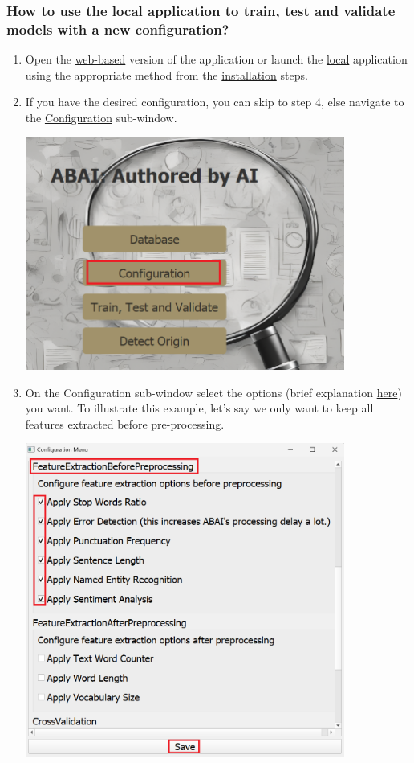\subsubsection{How to use the local application to train, test and validate models with a new configuration?}
\begin{enumerate}
    \item Open the \hyperref[subsubsec:Web application]{web-based} version of the application or launch the \hyperref[subsubsec:Local application]{local} application using the appropriate method from the \hyperref[subsec:First steps]{installation} steps.
    \item If you have the desired configuration, you can skip to step 4, else navigate to the \hyperref[subsubsec:configuration]{Configuration} sub-window.
    \begin{center}
        \includegraphics[width=10.5cm]{Images/Usage/Demo/config.png}
    \end{center}
    \item On the Configuration sub-window select the options (brief explanation \hyperref[subsubsec:config-brief-explain]{here}) you want. To illustrate this example, let's say we only want to keep all features extracted before pre-processing.
    \begin{center}
        \includegraphics[width=10.5cm]{Images/Usage/Demo/train-config.png}

\end{center}
\end{enumerate}
